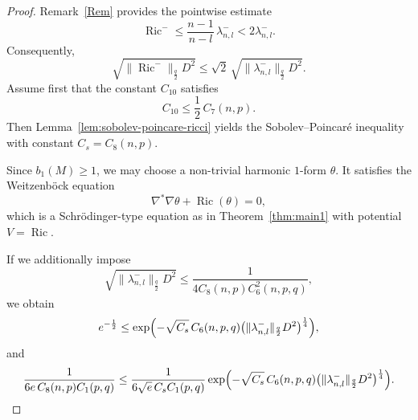 \documentclass[12pt, twoside]{article}
\theoremstyle{definition}
\numberwithin{equation}{section}
\begin{document}
\begin{proof}
	Remark~\ref{Rem} provides the pointwise estimate
	\[
	\operatorname{Ric}^{-} \le \frac{n-1}{n-l}\,\lambda_{n,l}^{-} < 2\lambda_{n,l}^{-}.
	\]
	Consequently,
	\begin{equation}\label{eq:Ric-bound}
	\sqrt{\|\operatorname{Ric}^{-}\|_{\frac{q}{2}}D^{2}}
	\le \sqrt{2}\,\sqrt{\|\lambda^{-}_{n,l}\|_{\frac{q}{2}}D^{2}} .
	\end{equation}
Assume first that the constant \(C_{10}\) satisfies
	\[
	C_{10} \le \frac{1}{2}\,C_{7}(n,p).
	\]
	Then Lemma~\ref{lem:sobolev-poincare-ricci} yields the Sobolev--Poincar\'e inequality with constant \(C_{s}=C_{8}(n,p)\).
	
	Since \(b_{1}(M)\ge 1\), we may choose a non-trivial harmonic \(1\)-form \(\theta\).  
	It satisfies the Weitzenb\"ock equation
	\[
	\nabla^{*}\nabla\theta + \operatorname{Ric}(\theta) = 0,
	\]
	which is a Schr\"odinger-type equation as in Theorem~\ref{thm:main1} with potential \(V=\operatorname{Ric}\).
	
	If we additionally impose
	\[
	\sqrt{\|\lambda_{n,l}^{-}\|_{\frac{q}{2}}D^{2}} \le \frac{1}{4 C_{8}(n,p)C^{2}_{6}(n,p,q)},
	\]
	we obtain
	\[
	e^{-\frac{1}{2}} \le \exp\Bigl(-\sqrt{C_s}\,C_6(n,p,q)\bigl(\|\lambda^{-}_{n,l}\|_{\frac{q}{2}}D^{2}\bigr)^{\frac{1}{4}}\Bigr),
	\]
	and
	\[
	\frac{1}{6e\,C_8(n,p) C_{1}(p,q)}
	\le \frac{1}{6\sqrt{e}\,C_s C_{1}(p,q)}
	\exp\Bigl(-\sqrt{C_s}\,C_6(n,p,q)\bigl(\|\lambda^{-}_{n,l}\|_{\frac{q}{2}}D^{2}\bigr)^{\frac{1}{4}}\Bigr).
	\]
	

\end{proof}
\end{document}
